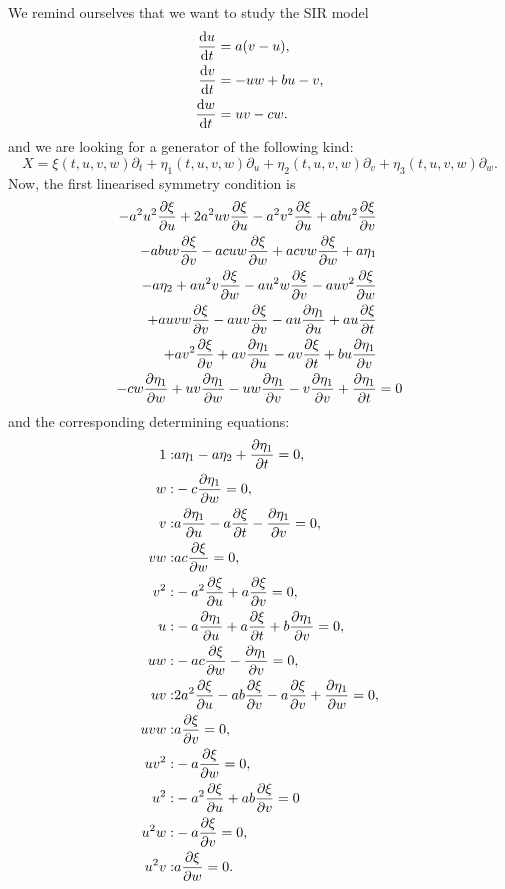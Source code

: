 We remind ourselves that we want to study the SIR model
\begin{equation*}
  \begin{split}
    \dv{u}{t}&=a(v-u),\\
    \dv{v}{t}&=-uw+bu-v,\\
    \dv{w}{t}&=uv-cw.
    \end{split}
  \end{equation*}
  and we are looking for a generator of the following kind:
\begin{equation}
X=\xi(t,u,v,w)\partial_t+\eta_1(t,u,v,w)\partial_u+\eta_2(t,u,v,w)\partial_v+\eta_3(t,u,v,w)\partial_w.
\end{equation}
Now, the first linearised symmetry condition is
\begin{align}
  - a^{2} u^{2} \pdv{\xi}{u} + 2 a^{2} u v \pdv{\xi}{u} - a^{2} v^{2} \pdv{\xi}{u} + a b u^{2} \pdv{\xi}{v}&\nonumber\\
  - a b u v \pdv{\xi}{v} - a c u w \pdv{\xi}{w} + a c v w \pdv{\xi}{w} + a \eta_1&\nonumber\\
  - a \eta_2 + a u^{2} v \pdv{\xi}{w} - a u^{2} w \pdv{\xi}{v} - a u v^{2} \pdv{\xi}{w}&\nonumber\\
  + a u v w \pdv{\xi}{v} - a u v \pdv{\xi}{v} - a u \pdv{\eta_1}{u} + a u \pdv{\xi}{t} &\nonumber\\
  + a v^{2} \pdv{\xi}{v} + a v \pdv{\eta_1}{u} - a v \pdv{\xi}{t} + b u \pdv{\eta_1}{v}&\nonumber\\
  - c w \pdv{\eta_1}{w} + u v \pdv{\eta_1}{w} - u w \pdv{\eta_1}{v} - v \pdv{\eta_1}{v} + \pdv{\eta_1}{t}&=0\label{eq:Lorenz_lin_sym_1}
\end{align}
and the corresponding determining equations:
\begin{align}
1:&a \eta_1 - a \eta_2 + \pdv{\eta_1}{t}=0,\\
w:&- c \pdv{\eta_1}{w}=0,\\
v:&a \pdv{\eta_1}{u} - a \pdv{\xi}{t} - \pdv{\eta_1}{v}=0,\\
v w:&a c \pdv{\xi}{w}=0,\\
v^{2}:&- a^{2} \pdv{\xi}{u} + a \pdv{\xi}{v}=0,\\
u:&- a \pdv{\eta_1}{u} + a \pdv{\xi}{t} + b \pdv{\eta_1}{v}=0,\\
u w:&- a c \pdv{\xi}{w} - \pdv{\eta_1}{v}=0,\\
u v:&2 a^{2} \pdv{\xi}{u} - a b \pdv{\xi}{v} - a \pdv{\xi}{v} + \pdv{\eta_1}{w}=0,\\
u v w:&a \pdv{\xi}{v}=0,\\
u v^{2}:&- a \pdv{\xi}{w}=0,\\
u^{2}:&- a^{2} \pdv{\xi}{u} + a b \pdv{\xi}{v}=0\\
u^{2} w:&- a \pdv{\xi}{v}=0,\\
u^{2} v:&a \pdv{\xi}{w}=0.
\end{align}
